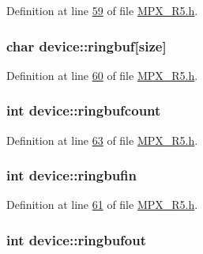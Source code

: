 Definition at line \hyperlink{_m_p_x___r5_8h_source_l00059}{59} of file \hyperlink{_m_p_x___r5_8h_source}{MPX\_\-R5.h}.

\hypertarget{structdevice_add9c4fe8b331128af0f655bc74410ffd}{
\subsubsection[{ringbuf}]{\setlength{\rightskip}{0pt plus 5cm}char {\bf device::ringbuf}\mbox{[}size\mbox{]}}}
\label{structdevice_add9c4fe8b331128af0f655bc74410ffd}


Definition at line \hyperlink{_m_p_x___r5_8h_source_l00060}{60} of file \hyperlink{_m_p_x___r5_8h_source}{MPX\_\-R5.h}.

\hypertarget{structdevice_ad06a8146a22a605c0f463b212774cc92}{
\subsubsection[{ringbufcount}]{\setlength{\rightskip}{0pt plus 5cm}int {\bf device::ringbufcount}}}
\label{structdevice_ad06a8146a22a605c0f463b212774cc92}


Definition at line \hyperlink{_m_p_x___r5_8h_source_l00063}{63} of file \hyperlink{_m_p_x___r5_8h_source}{MPX\_\-R5.h}.

\hypertarget{structdevice_a87b6f10cd47f45a38cfa264c298acc04}{
\subsubsection[{ringbufin}]{\setlength{\rightskip}{0pt plus 5cm}int {\bf device::ringbufin}}}
\label{structdevice_a87b6f10cd47f45a38cfa264c298acc04}


Definition at line \hyperlink{_m_p_x___r5_8h_source_l00061}{61} of file \hyperlink{_m_p_x___r5_8h_source}{MPX\_\-R5.h}.

\hypertarget{structdevice_ac5f863bd4d89e6182fb4c517d93afb8e}{
\subsubsection[{ringbufout}]{\setlength{\rightskip}{0pt plus 5cm}int {\bf device::ringbufout}}}
\label{structdevice_ac5f863bd4d89e6182fb4c517d93afb8e}


